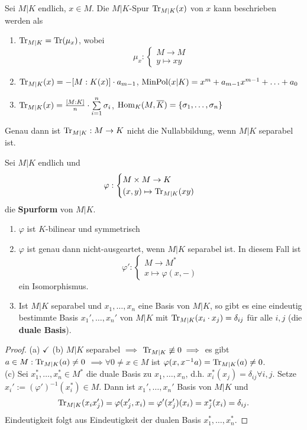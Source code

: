 \begin{erinnerungnr}
    Sei $M|K$ endlich, $x \in M$. Die $M|K$-Spur $\operatorname{Tr}_{M|K}(x)$ von $x$ kann beschrieben werden als
    \begin{enumerate}[label=(\arabic*)]
        \item $\operatorname{Tr}_{M|K} = \operatorname{Tr}(\mu_x)$, wobei
        $$ \mu_x : \begin{cases}
            M \to M\\
            y \mapsto xy
        \end{cases}$$

        \item $\operatorname{Tr}_{M|K}(x) = - [M:K(x)] \cdot a_{m-1}$, $\operatorname{MinPol} (x|K) = x^m + a_{m-1}x^{m-1} + \ldots + a_0$
        \item $\operatorname{Tr}_{M|K}(x) = \frac{[M:K]}{n} \cdot \sum\limits_{i=1}^n \sigma_i$, $\operatorname{Hom}_K (M, \overline{K}) = \{\sigma_1, \ldots, \sigma_n\}$
    \end{enumerate}
    Genau dann ist $\operatorname{Tr}_{M|K}: M \to K$ nicht die Nullabbildung, wenn $M|K$ separabel ist.
\end{erinnerungnr}

\begin{lemma}
    Sei $M|K$ endlich und 
    $$ \varphi : \begin{cases}
        M \times M \to K\\
        (x,y) \mapsto \operatorname{Tr}_{M|K}(xy)
    \end{cases}$$
    die \textbf{Spurform} von $M|K$.
    \begin{enumerate}[label=(\alph*)]
        \item $\varphi$ ist $K$-bilinear und symmetrisch
        \item $\varphi$ ist genau dann nicht-ausgeartet, wenn $M|K$ separabel ist. In diesem Fall ist
        $$ \varphi': \begin{cases}
            M \to M^\ast\\
            x \mapsto \varphi(x,-)
        \end{cases}$$
        ein Isomorphismus.

        \item Ist $M|K$ separabel und $x_1,\ldots,x_n$ eine Basis von $M|K$, so gibt es eine eindeutig bestimmte Basis
        $x_1',\ldots,x_n'$ von $M|K$ mit $\operatorname{Tr}_{M|K}(x_i\cdot x_j) = \delta_{ij}$ für alle $i,j$ (die \textbf{duale Basis}).
    \end{enumerate}
\end{lemma}
\begin{proof}
    (a) $\checkmark$ (b) $M|K$ separabel $\implies$ $\operatorname{Tr}_{M|K} \not \equiv 0 \implies$ es gibt $a \in M: \operatorname{Tr}_{M|K}(a) \neq 0$
    $\implies \forall 0 \ne x \in M$ ist $\varphi(x, x^{-1}a) = \operatorname{Tr}_{M|K}(a) \ne 0$.\\
    (c) Sei $x_1^\ast, \ldots, x_n^\ast \in M^\ast$ die duale Basis zu $x_1,\ldots,x_n$, d.h. $x_i^\ast(x_j) = \delta_{ij} \forall i,j$.
    Setze $x_i' := (\varphi')^{-1}(x_i^\ast) \in M$. Dann ist $x_1',\ldots,x_n'$ Basis von $M|K$ und 
    $$ \operatorname{Tr}_{M|K}(x_i x_j') = \varphi(x_j',x_i) = \varphi'(x_j')(x_i) = x_j^\ast(x_i) = \delta_{ij}.$$
    Eindeutigkeit folgt aus Eindeutigkeit der dualen Basis $x_1^\ast,\ldots,x_n^\ast$.
\end{proof}

